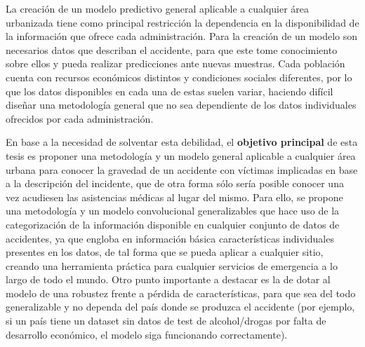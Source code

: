 
La creación de un modelo predictivo general aplicable a cualquier área urbanizada tiene como principal restricción la dependencia en la disponibilidad de la información que ofrece cada administración. Para la creación de un modelo son necesarios datos que describan el accidente, para que este tome conocimiento sobre ellos y pueda realizar predicciones ante nuevas muestras. Cada población cuenta con recursos económicos distintos y condiciones sociales diferentes, por lo que los datos disponibles en cada una de estas suelen variar, haciendo difícil diseñar una metodología general que no sea dependiente de los datos individuales ofrecidos por cada administración.

En base a la necesidad de solventar esta debilidad, el \textbf{objetivo principal} de esta tesis es proponer una metodología y un modelo general aplicable a cualquier área urbana para conocer la gravedad de un accidente con víctimas implicadas en base a la descripción del incidente, que de otra forma sólo sería posible conocer una vez acudiesen las asistencias médicas al lugar del mismo. Para ello, se propone una metodología y un modelo convolucional generalizables que hace uso de la categorización de la información disponible en cualquier conjunto de datos de accidentes, ya que engloba en información básica características individuales presentes en los datos, de tal forma que se pueda aplicar a cualquier sitio, creando una herramienta práctica para cualquier servicios de emergencia a lo largo de todo el mundo.
Otro punto importante a destacar es la de dotar al modelo de una robustez frente a pérdida de características, para que sea del todo generalizable y no dependa del país donde se produzca el accidente (por ejemplo, si un país tiene un dataset sin datos de test de alcohol/drogas por falta de desarrollo económico, el modelo siga funcionando correctamente).




